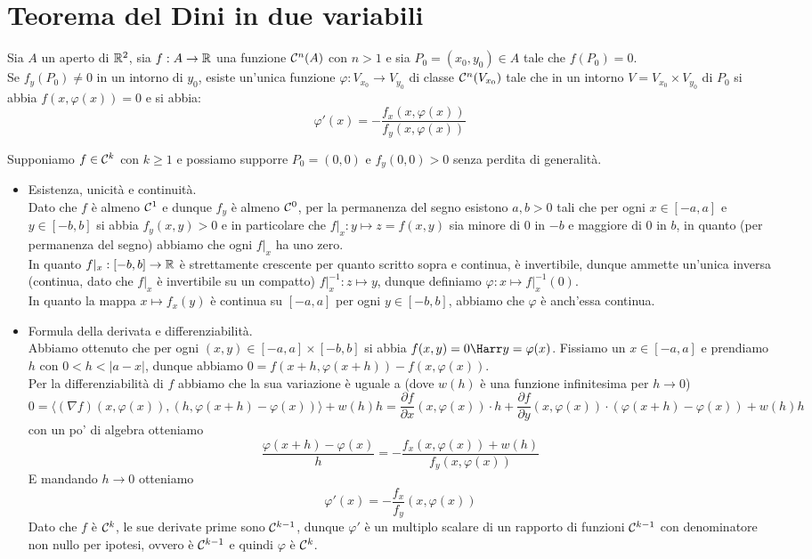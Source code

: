 \documentclass[openany]{book}
\begin{document}
\section{Teorema del Dini in due variabili}

\begin{theorem}{}{}
    Sia $A$ un aperto di $\mathbb{R}^2$, sia $f:A\to\mathbb{R}$ una funzione $\mathcal{C}^n(A)$ con $n>1$ e sia $P_0=(x_0,y_0) \in A$ tale che $f(P_0)=0$.\\
    Se $f_y(P_0) \neq 0$ in un intorno di $y_0$, esiste un'unica funzione $\varphi : V_{x_0} \to V_{y_0}$ di classe $\mathcal{C}^n(V_{x_0})$ tale che in un intorno $V=V_{x_0}\times V_{y_0}$ di $P_0$ si abbia $f(x,\varphi(x))=0$ e si abbia:
    \[\varphi'(x)=-\frac{f_x(x,\varphi(x))}{f_y(x,\varphi(x))}\]
\end{theorem}

    Supponiamo $f \in \mathcal{C}^k$ con $k\ge 1$ e possiamo supporre $P_0= (0,0)$ e $f_y(0,0)>0$ senza perdita di generalità.\begin{itemize}
        \item Esistenza, unicità e continuità.\\
        Dato che $f$ è almeno $\mathcal{C}^1$ e dunque $f_y$ è almeno $\mathcal{C}^0$, per la permanenza del segno esistono $a,b>0$ tali che per ogni $x \in [-a,a]$ e $y \in [-b,b]$ si abbia $f_y(x,y)>0$ e in particolare che $f|_x : y\mapsto z = f(x,y)$ sia minore di $0$ in $-b$ e maggiore di $0$ in $b$, in quanto (per permanenza del segno) abbiamo che ogni $f|_x$ ha uno zero.\\
        In quanto $f|_x:[-b,b]\to\mathbb{R}$ è strettamente crescente per quanto scritto sopra e continua, è invertibile, dunque ammette un'unica inversa (continua, dato che $f|_x$ è invertibile su un compatto) $f|_x^{-1} : z \mapsto y$, dunque definiamo $\varphi:x \mapsto f|_x^{-1}(0)$.\\
        In quanto la mappa $x\mapsto f_x(y)$ è continua su $[-a,a]$ per ogni $y \in [-b,b]$, abbiamo che $\varphi$ è anch'essa continua.
        \item Formula della derivata e differenziabilità.\\
        Abbiamo ottenuto che per ogni  $(x,y)\in[-a,a]\times [-b,b]$ si abbia $f(x,y)=0\Harr y = \varphi (x)$. Fissiamo un $x \in [-a,a]$ e prendiamo $h$ con $0<h<|a-x|$, dunque abbiamo $0 = f(x+h,\varphi(x+h)) - f(x,\varphi(x))$.\\
        Per la differenziabilità di $f$ abbiamo che la sua variazione è uguale a (dove $w(h)$ è una funzione infinitesima per $h\to 0$)
        \[0=\langle (\nabla f) (x,\varphi(x)), (h, \varphi(x+h) - \varphi(x)) \rangle + w(h)h = \frac{\partial f}{\partial x}(x,\varphi(x)) \cdot h + \frac{\partial f}{\partial y} (x,\varphi(x)) \cdot (\varphi(x+h) - \varphi(x)) + w(h)h\]
        con un po' di algebra otteniamo
        \[\frac{\varphi(x+h) - \varphi(x)}{h} = -\frac{f_x(x,\varphi(x)) + w(h)}{f_y(x,\varphi(x))}\]
        E mandando $h\to 0$ otteniamo
        \[\varphi'(x) = -\frac{f_x}{f_y}(x,\varphi(x))\]
        Dato che $f$ è $\mathcal{C}^k$, le sue derivate prime sono $\mathcal{C}^{k-1}$, dunque $\varphi'$ è un multiplo scalare di un rapporto di funzioni $\mathcal{C}^{k-1}$ con denominatore non nullo per ipotesi, ovvero è $\mathcal{C}^{k-1}$ e quindi $\varphi$ è $\mathcal{C}^k$.
    \end{itemize}
\end{document}
